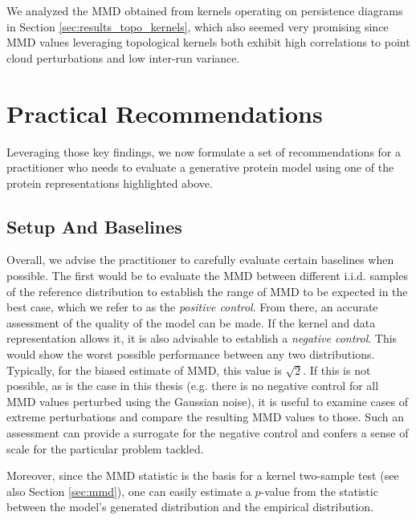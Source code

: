 We analyzed the MMD obtained from kernels operating on persistence diagrams in
Section \ref{sec:results_topo_kernels}, which also seemed very promising since
MMD values leveraging topological kernels both exhibit high correlations to
point cloud perturbations and low inter-run variance.

\section{Practical Recommendations}\label{sec:discussion_recommendations}

Leveraging those key findings, we now formulate a set of recommendations for a
practitioner who needs to evaluate a generative protein model using one of the
protein representations highlighted above.


\subsection{Setup And Baselines}\label{sec:discussion_baselines}

Overall, we advise the practitioner to carefully evaluate certain baselines when
possible. The first would be to evaluate the MMD between different i.i.d.
samples of the reference distribution to establish the range of MMD to be
expected in the best case, which we refer to as the \emph{positive control}.
From there, an accurate assessment of the quality of the model can be made. If
the kernel and data representation allows it, it is also advisable to establish
a \emph{negative control}. This would show the worst possible performance
between any two distributions. Typically, for the biased estimate of MMD, this
value is $\sqrt{2}$. If this is not possible, as is the case in this thesis
(e.g. there is no negative control for all MMD values perturbed using the Gaussian noise), it
is useful to examine cases of extreme perturbations and compare the resulting
MMD values to those. Such an assessment can provide a surrogate for the negative
control and confers a sense of scale for the particular problem tackled.

Moreover, since the MMD statistic is the basis for a kernel two-sample test
\citep{gretton2012kernel} (see also Section \ref{sec:mmd}), one can easily
estimate a $p$-value from the statistic between the model's generated
distribution and the empirical distribution.

